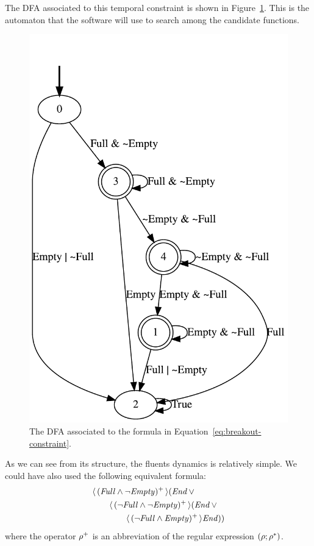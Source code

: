 The DFA associated to this temporal constraint is shown in
Figure~\ref{fig:breakout-constraint}. This is the automaton that the software
will use to search among the candidate functions.
\begin{figure}
	\centering
	\includegraphics[height=0.5\textheight]{./imgs/br_constraints.pdf}
	\caption{The DFA associated to the formula in
	Equation~\eqref{eq:breakout-constraint}.}
	\label{fig:breakout-constraint}
\end{figure}
As we can see from its structure, the fluents dynamics is relatively simple.
We could have also used the following equivalent formula:
\begin{equation}
	\begin{aligned}
		&\langle\, {(\text{\textit{Full}} \land \neg \text{\textit{Empty}})^+} \,\rangle
			(\text{\textit{End}} \,\lor \\
		&\qquad\langle\, {(\neg \text{\textit{Full}} \land \neg \text{\textit{Empty}})^+} \,\rangle
			(\text{\textit{End}} \,\lor \\
		&\qquad\qquad \langle\, {(\neg \text{\textit{Full}} \land \text{\textit{Empty}})^+} \,\rangle
			\text{\textit{End}}))
	\end{aligned}
\end{equation}
where the operator $\rho^+$ is an abbreviation of the regular expression
$(\rho; \rho^*)$.

